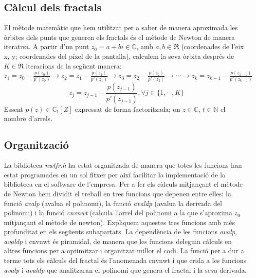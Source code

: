 \documentclass[12pt]{report}
\begin{document}
\subsection{Càlcul dels fractals}
El mètode matemàtic que hem utilitzat per a saber de manera aproximada les òrbites dels punts que generen els fractals és el mètode de Newton de manera iterativa.
\newline
A partir d'un punt $z_0=a+bi\in\mathbb{C}$, amb $a,b\in\Re$ (coordenades de l'eix x, y; coordenades del píxel de la pantalla), calculem la seva òrbita després de $K\in\Re$ iteracions de la següent manera:
\newline
$z_1=z_0-\frac{p(z_0)}{p'(z_0)} \longrightarrow z_2=z_1-\frac{p(z_1)}{p'(z_1)} \longrightarrow z_3=z_2-\frac{p(z_2)}{p'(z_2)} \longrightarrow \cdots \longrightarrow z_k=z_{k-1}-\frac{p(z_{k-1})}{p'(z_{k-1})}$ $$z_j=z_{j-1}-\frac{p(z_{j-1})}{p'(z_{j-1})}, \forall j \in \{1, \cdots, K\}$$
Essent $p(z)\in\mathbb{C}_t[Z]$ expressat de forma factoritzada; on $z\in\mathbb{C}$, $t\in\mathbb{N}$ el nombre d'arrels.


\subsection{Organització}
\justifying
La biblioteca \textit{nwtfr.h} ha estat organitzada de manera que totes les funcions han estat programades en un sol fitxer per així facilitar la implementació de la biblioteca en el software de l'empresa.
\newline
Per a fer els càlculs mitjançant el mètode de Newton hem dividit el treball en tres funcions que depenen entre elles: la funció \textit{avalp} (avalua el polinomi), la funció \textit{avaldp} (avalua la derivada del polinomi) i la funció \textit{cnvnwt} (calcula l'arrel del polinomi a la que s'aproxima $z_0$ mitjançant el mètode de newton). Expliquem aquestes tres funcions amb més profunditat en els següents subapartats.
\newline
La dependència de les funcions \textit{avalp}, \textit{avaldp} i cnvnwt és piramidal, de manera que les funcions deleguin càlculs en altres funcions per a optimitzar i organitzar millor el codi.
\newline
La funció per a dur a terme tots els càlculs del fractal és l'anomenada cnvnwt i que crida a les funcions \textit{avalp} i \textit{avaldp} que analitzaran el polinomi que genera el fractal i la seva derivada.
\end{document}
